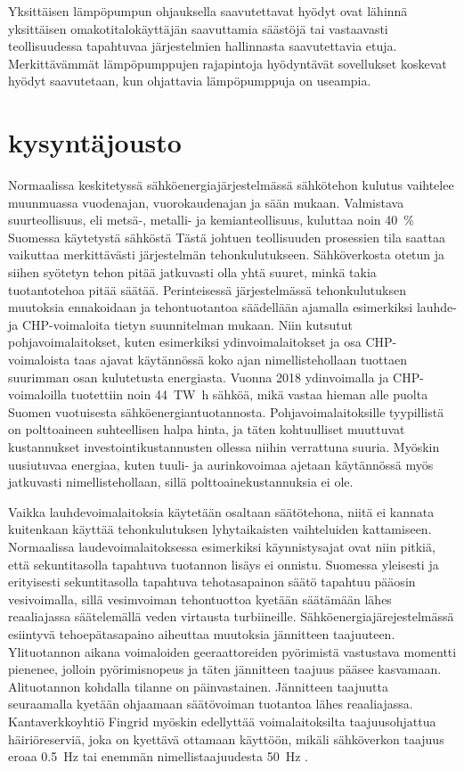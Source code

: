   Yksittäisen lämpöpumpun ohjauksella saavutettavat hyödyt ovat lähinnä yksittäisen omakotitalokäyttäjän saavuttamia säästöjä tai vastaavasti teollisuudessa tapahtuvaa järjestelmien hallinnasta saavutettavia etuja. Merkittävämmät lämpöpumppujen rajapintoja hyödyntävät sovellukset koskevat hyödyt saavutetaan, kun ohjattavia lämpöpumppuja on useampia.

\section{kysyntäjousto}

  Normaalissa keskitetyssä sähköenergiajärjestelmässä sähkötehon kulutus vaihtelee muunmuassa vuodenajan, vuorokaudenajan ja sään mukaan. Valmistava suurteollisuus, eli metsä-, metalli- ja kemianteollisuus, kuluttaa noin \SI{40}{\percent} Suomessa käytetystä sähköstä Tästä johtuen teollisuuden prosessien tila saattaa vaikuttaa merkittävästi järjestelmän tehonkulutukseen\parencite{SVTehk}. Sähköverkosta otetun ja siihen syötetyn tehon pitää jatkuvasti olla yhtä suuret, minkä takia tuotantotehoa pitää säätää. Perinteisessä järjestelmässä tehonkulutuksen muutoksia ennakoidaan ja tehontuotantoa säädellään ajamalla esimerkiksi lauhde- ja \gls{CHP}-voimaloita tietyn suunnitelman mukaan.\parencite{energiateollisuus} Niin kutsutut pohjavoimalaitokset, kuten esimerkiksi ydinvoimalaitokset ja osa \gls{CHP}-voimaloista taas ajavat käytännössä koko ajan nimellistehollaan tuottaen suurimman osan kulutetusta energiasta. Vuonna 2018 ydinvoimalla ja CHP-voimaloilla tuotettiin noin \SI{44}{\tera\watt\hour} sähköä, mikä vastaa hieman alle puolta Suomen vuotuisesta sähköenergiantuotannosta.\parencite{SVTSaLaTuo} Pohjavoimalaitoksille tyypillistä on polttoaineen suhteellisen halpa hinta, ja täten kohtuulliset muuttuvat kustannukset investointikustannusten ollessa niihin verrattuna suuria. Myöskin uusiutuvaa energiaa, kuten tuuli- ja aurinkovoimaa ajetaan käytännössä myös jatkuvasti nimellistehollaan, sillä polttoainekustannuksia ei ole.

  Vaikka lauhdevoimalaitoksia käytetään osaltaan säätötehona, niitä ei kannata kuitenkaan käyttää tehonkulutuksen lyhytaikaisten vaihteluiden kattamiseen. Normaalissa laudevoimalaitoksessa esimerkiksi käynnistysajat ovat niin pitkiä, että sekuntitasolla tapahtuva tuotannon lisäys ei onnistu.\parencite{VJV2018} Suomessa yleisesti ja erityisesti sekuntitasolla tapahtuva tehotasapainon säätö tapahtuu pääosin vesivoimalla\parencite{energiateollisuus}, sillä vesimvoiman tehontuottoa kyetään säätämään lähes reaaliajassa säätelemällä veden virtausta turbiineille. Sähköenergiajärejestelmässä esiintyvä tehoepätasapaino aiheuttaa muutoksia jännitteen taajuuteen. Ylituotannon aikana voimaloiden geeraattoreiden pyörimistä vastustava momentti pienenee, jolloin pyörimisnopeus ja täten jännitteen taajuus pääsee kasvamaan. Alituotannon kohdalla tilanne on päinvastainen. Jännitteen taajuutta seuraamalla kyetään ohjaamaan säätövoiman tuotantoa lähes reaaliajassa. Kantaverkkoyhtiö Fingrid myöskin edellyttää voimalaitoksilta taajuusohjattua häiriöreserviä, joka on kyettävä ottamaan käyttöön, mikäli sähköverkon taajuus eroaa \SI{0.5}{\hertz} tai enemmän nimellistaajuudesta \SI{50}{\hertz} \parencite{VJV2018}.

